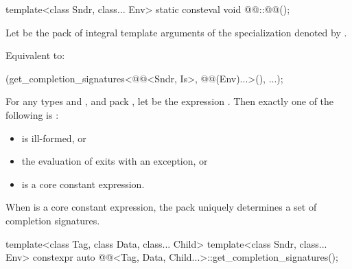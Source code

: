 %
\begin{itemdecl}
template<class Sndr, class... Env>
  static consteval void @@::@@();
\end{itemdecl}

\begin{itemdescr}
\pnum
Let  be the pack of integral template arguments of
the  specialization denoted by
.

\pnum
\effects
Equivalent to:
\begin{codeblock}
(get_completion_signatures<@@<Sndr, Is>, @@(Env)...>(), ...);
\end{codeblock}

\pnum
\begin{note}
For any types  and , and pack ,
let  be the expression
.
Then exactly one of the following is :
\begin{itemize}
\item {} is ill-formed, or
\item the evaluation of  exits with an exception, or
\item {} is a core constant expression.
\end{itemize}
When  is a core constant expression,
the pack  uniquely determines a set of completion signatures.
\end{note}
\end{itemdescr}

%
\begin{itemdecl}
template<class Tag, class Data, class... Child>
  template<class Sndr, class... Env>
    constexpr auto @@<Tag, Data, Child...>::get_completion_signatures();
\end{itemdecl}

